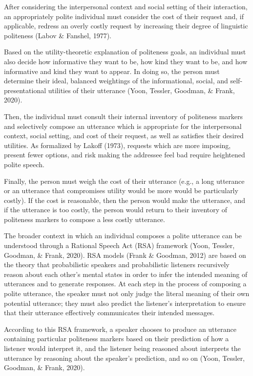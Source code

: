 \documentclass[
  english,
  man,floatsintext]{apa6}
\begin{document}
After considering the interpersonal context and social setting of their interaction, an appropriately polite individual must consider the cost of their request and, if applicable, redress an overly costly request by increasing their degree of linguistic politeness (Labov \& Fanshel, 1977).

Based on the utility-theoretic explanation of politeness goals, an individual must also decide how informative they want to be, how kind they want to be, and how informative and kind they want to appear. In doing so, the person must determine their ideal, balanced weightings of the informational, social, and self- presentational utilities of their utterance (Yoon, Tessler, Goodman, \& Frank, 2020).

Then, the individual must consult their internal inventory of politeness markers and selectively compose an utterance which is appropriate for the interpersonal context, social setting, and cost of their request, as well as satisfies their desired utilities. As formalized by Lakoff (1973), requests which are more imposing, present fewer options, and risk making the addressee feel bad require heightened polite speech.

Finally, the person must weigh the cost of their utterance (e.g., a long utterance or an utterance that compromises utility would be more would be particularly costly). If the cost is reasonable, then the person would make the utterance, and if the utterance is too costly, the person would return to their inventory of politeness markers to compose a less costly utterance.

The broader context in which an individual composes a polite utterance can be understood through a Rational Speech Act (RSA) framework (Yoon, Tessler, Goodman, \& Frank, 2020). RSA models (Frank \& Goodman, 2012) are based on the theory that probabilistic speakers and probabilistic listeners recursively reason about each other's mental states in order to infer the intended meaning of utterances and to generate responses. At each step in the process of composing a polite utterance, the speaker must not only judge the literal meaning of their own potential utterance; they must also predict the listener's interpretation to ensure that their utterance effectively communicates their intended messages.

According to this RSA framework, a speaker chooses to produce an utterance containing particular politeness markers based on their prediction of how a listener would interpret it, and the listener being reasoned about interprets the utterance by reasoning about the speaker's prediction, and so on (Yoon, Tessler, Goodman, \& Frank, 2020).
\end{document}
